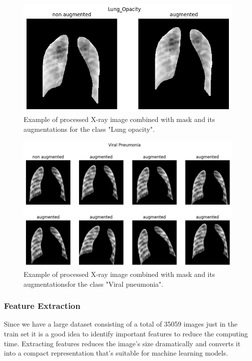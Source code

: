 \documentclass{article}
\begin{document}
\begin{figure}[H] %
    \centering
    \includegraphics[width=0.65\linewidth]{aug_example_lung_opcacity.png}
    \caption{Example of processed X-ray image combined with mask and its augmentations for the class "Lung opacity".}
    \label{fig:aug_example_lung_opcacity}
\end{figure}

\begin{figure}[!htb] %
    \centering
    \includegraphics[width=1.0\linewidth]{aug_example_viral_pn.png}
    \caption{Example of processed X-ray image combined with mask and its augmentationsfor the class "Viral pneumonia".}
    \label{fig:aug_example_viral_pn}
\end{figure}


\subsubsection{Feature Extraction}
Since we have a large dataset consisting of a total of 35059 images just in the train set it is a good idea to identify important features to reduce the computing time.
Extracting features reduces the image's size dramatically and converts it into a compact representation that's suitable for machine learning models. 
\end{document}
